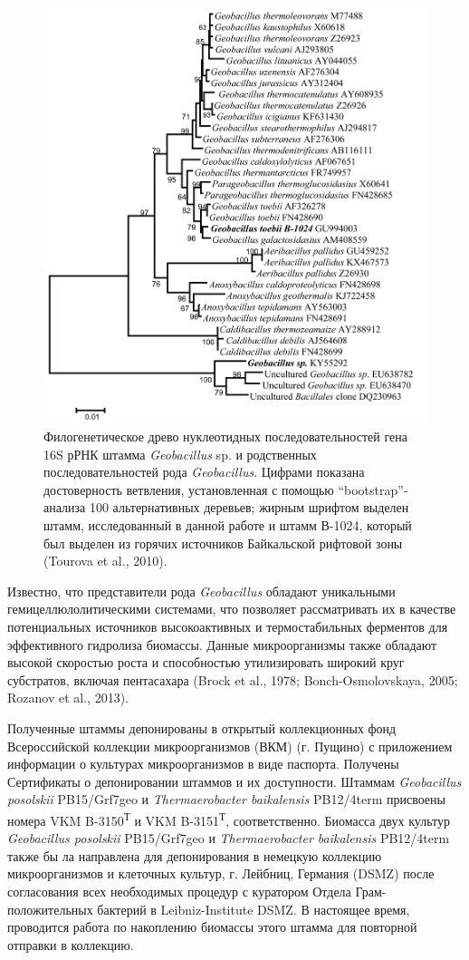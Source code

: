 \documentclass[a4paper,12pt,openany,final]{extreport}
\def\oldcaption{} \let\oldcaption=\caption
\def\caption{\stepcounter{captionsnum}\oldcaption}
\begin{document}
\begin{figure}\centering
\includegraphics[width=0.9\linewidth]{media/image13.png}

\caption{Филогенетическое древо нуклеотидных последовательностей
гена 16S рРНК штамма \emph{Geobacillus} sp. и родственных
последовательностей рода \emph{Geobacillus}. Цифрами показана
достоверность ветвления, установленная с помощью ``bootstrap''- анализа
100 альтернативных деревьев; жирным шрифтом выделен штамм, исследованный
в данной работе и штамм В-1024, который был выделен из горячих
источников Байкальской рифтовой зоны (Tourova et al., 2010).}\label{fig:5-2}
\end{figure}

Известно, что представители рода \emph{Geobacillus} обладают уникальными
гемицеллюлолитическими системами, что позволяет рассматривать их в
качестве потенциальных источников высокоактивных и термостабильных
ферментов для эффективного гидролиза биомассы. Данные микроорганизмы
также обладают высокой скоростью роста и способностью утилизировать
широкий круг субстратов, включая пентасахара (Brock et al., 1978;
Bonch-Osmolovskaya, 2005; Rozanov et al., 2013).

Полученные штаммы депонированы в открытый коллекционных фонд
Всероссийской коллекции микроорганизмов (ВКМ) (г. Пущино) с приложением
информации о культурах микроорганизмов в виде паспорта. Получены
Сертификаты о депонировании штаммов и их доступности. Штаммам
\emph{Geobacillus posolskii} PB15/Grf7geo и \emph{Thermaerobacter
baikalensis} PB12/4term присвоены номера VKM B-3150\textsuperscript{Т} и
VKM B-3151\textsuperscript{Т}, соответственно. Биомасса двух культур
\emph{Geobacillus posolskii} PB15/Grf7geo и \emph{Thermaerobacter
baikalensis} PB12/4term также бы ла направлена для депонирования в
немецкую коллекцию микроорганизмов и клеточных культур, г. Лейбниц,
Германия (DSMZ) после согласования всех необходимых процедур с куратором
Отдела Грам-положительных бактерий в Leibniz-Institute DSMZ. В настоящее
время, проводится работа по накоплению биомассы этого штамма для
повторной отправки в коллекцию.
\end{document}
